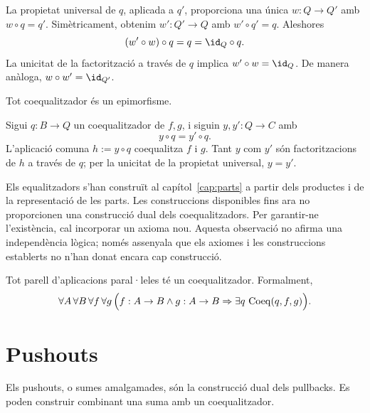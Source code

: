 \begin{prova}
La propietat universal de \(q\), aplicada a \(q'\), proporciona una única \(w:Q\to Q'\) amb \(w\circ q=q'\). Simètricament, obtenim \(w':Q'\to Q\) amb \(w'\circ q'=q\). Aleshores
\[
(w'\circ w)\circ q=q=\id_Q\circ q.
\]
La unicitat de la factorització a través de \(q\) implica \(w'\circ w=\id_Q\). De manera anàloga, \(w\circ w'=\id_{Q'}\).
\end{prova}

\begin{proposicio}\label{prop:coequalitzador-epi}
Tot coequalitzador és un epimorfisme.
\end{proposicio}

\begin{prova}
Sigui \(q:B\to Q\) un coequalitzador de \(f,g\), i siguin \(y,y':Q\to C\) amb
\[
y\circ q=y'\circ q.
\]
L'aplicació comuna \(h:=y\circ q\) coequalitza \(f\) i \(g\). Tant \(y\) com \(y'\) són factoritzacions de \(h\) a través de \(q\); per la unicitat de la propietat universal, \(y=y'\).
\end{prova}

\begin{observacio}\label{obs:necessitat-coequalitzadors}
Els equalitzadors s'han construït al capítol~\ref{cap:parts} a partir dels productes i de la representació de les parts. Les construccions disponibles fins ara no proporcionen una construcció dual dels coequalitzadors. Per garantir-ne l'existència, cal incorporar un axioma nou. Aquesta observació no afirma una independència lògica; només assenyala que els axiomes i les construccions establerts no n'han donat encara cap construcció.
\end{observacio}

\begin{axioma}\label{ax:coequalitzadors}
Tot parell d'aplicacions paral·leles té un coequalitzador. Formalment,
\[
\forall A\,\forall B\,\forall f\,\forall g\,
\Bigl(
 f:A\to B\land g:A\to B
 \Rightarrow
 \exists q\,\operatorname{Coeq}(q,f,g)
\Bigr).
\]
\end{axioma}

\section{Pushouts}\label{sec:pushouts}

Els pushouts, o sumes amalgamades, són la construcció dual dels pullbacks. Es poden construir combinant una suma amb un coequalitzador.

